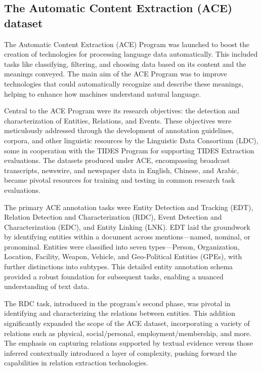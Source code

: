\subsection{The Automatic Content Extraction (ACE) dataset}

The Automatic Content Extraction (ACE) Program was launched to boost the creation of technologies for processing language data automatically\cite{ACE}. This included tasks like classifying, filtering, and choosing data based on its content and the meanings conveyed. The main aim of the ACE Program was to improve technologies that could automatically recognize and describe these meanings, helping to enhance how machines understand natural language.

Central to the ACE Program were its research objectives: the detection and characterization of Entities, Relations, and Events. These objectives were meticulously addressed through the development of annotation guidelines, corpora, and other linguistic resources by the Linguistic Data Consortium (LDC), some in cooperation with the TIDES Program for supporting TIDES Extraction evaluations. The datasets produced under ACE, encompassing broadcast transcripts, newswire, and newspaper data in English, Chinese, and Arabic, became pivotal resources for training and testing in common research task evaluations.

The primary ACE annotation tasks were Entity Detection and Tracking (EDT), Relation Detection and Characterization (RDC), Event Detection and Characterization (EDC), and Entity Linking (LNK). EDT laid the groundwork by identifying entities within a document across mentions—named, nominal, or pronominal. Entities were classified into seven types—Person, Organization, Location, Facility, Weapon, Vehicle, and Geo-Political Entities (GPEs), with further distinctions into subtypes. This detailed entity annotation schema provided a robust foundation for subsequent tasks, enabling a nuanced understanding of text data.

The RDC task, introduced in the program's second phase, was pivotal in identifying and characterizing the relations between entities. This addition significantly expanded the scope of the ACE dataset, incorporating a variety of relations such as physical, social/personal, employment/membership, and more. The emphasis on capturing relations supported by textual evidence versus those inferred contextually introduced a layer of complexity, pushing forward the capabilities in relation extraction technologies.

